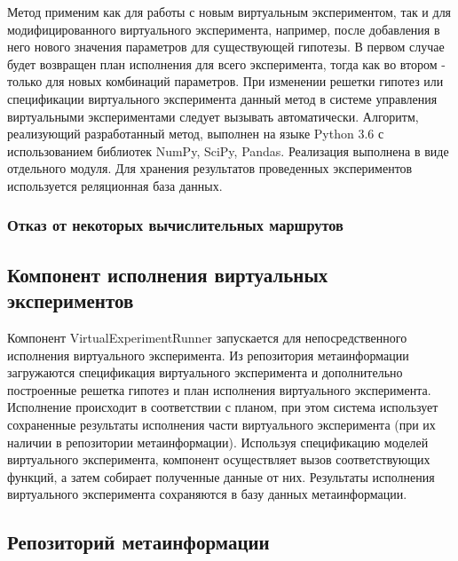 Метод применим как для работы с новым виртуальным экспериментом, так и для модифицированного виртуального 
эксперимента, например, после добавления в него нового значения параметров для существующей гипотезы. В первом 
случае будет возвращен план исполнения для всего эксперимента, тогда как во втором - только для новых комбинаций 
параметров. При изменении решетки гипотез или спецификации виртуального эксперимента данный метод в системе управления 
виртуальными экспериментами следует вызывать автоматически.
Алгоритм, реализующий разработанный метод, выполнен на языке Python 3.6 с использованием библиотек NumPy, SciPy, 
Pandas. Реализация выполнена в виде отдельного модуля. Для хранения результатов проведенных экспериментов используется 
реляционная база данных.


\subsubsection{Отказ от некоторых вычислительных маршрутов}\label{sect_4_3}



\subsection{Компонент исполнения виртуальных экспериментов}\label{sect_4_2_6}

Компонент VirtualExperimentRunner запускается для непосредственного исполнения виртуального эксперимента. 
Из репозитория метаинформации загружаются спецификация виртуального эксперимента и дополнительно построенные 
решетка гипотез и план исполнения виртуального эксперимента. Исполнение происходит в соответствии с планом, при 
этом система использует сохраненные результаты исполнения части виртуального эксперимента (при их наличии в 
репозитории метаинформации). Используя спецификацию моделей виртуального эксперимента, компонент осуществляет 
вызов соответствующих функций, а затем собирает полученные данные от них. Результаты исполнения виртуального 
эксперимента сохраняются в базу данных метаинформации.


\subsection{Репозиторий метаинформации}\label{sect_4_2_7}

